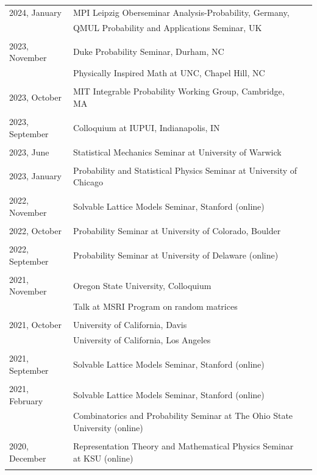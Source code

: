 \documentclass[letterpaper,11pt]{article}
\begin{document}
\begin{longtable}{llc}
	2024, January
	& MPI Leipzig Oberseminar Analysis-Probability, Germany,
	\\
	& QMUL Probability and Applications Seminar, UK
	\\\\
	2023, November
	& Duke Probability Seminar, Durham, NC
	\\
	& Physically Inspired Math at UNC, Chapel Hill, NC
	\\\\
	2023, October
	& MIT Integrable Probability Working Group, Cambridge, MA
	\\\\
	2023, September
	& Colloquium at IUPUI, Indianapolis, IN
	\\\\
	2023, June
	& Statistical Mechanics Seminar at University of Warwick
	\\\\
	2023, January
	& Probability and Statistical Physics Seminar at University of Chicago
	\\\\
	2022, November
	& Solvable Lattice Models Seminar, Stanford (online)
	\\\\
	2022, October
	& Probability Seminar at University of Colorado, Boulder
	\\\\
	2022, September
	& Probability Seminar at University of Delaware (online)
	\\\\
	2021, November
	& Oregon State University, Colloquium
	\\
	& Talk at MSRI Program on random matrices
	\\\\
	2021, October
	& University of California, Davis
	\\
	& University of California, Los Angeles
	\\\\
	2021, September
	& Solvable Lattice Models Seminar, Stanford (online)
	\\\\
	2021, February
	& Solvable Lattice Models Seminar, Stanford (online)
	\\
	&
	Combinatorics and Probability Seminar at The Ohio State University (online)
	\\\\
	2020, December
	& Representation Theory and Mathematical Physics Seminar at KSU (online)
	\\\\

\end{longtable}
\end{document}
